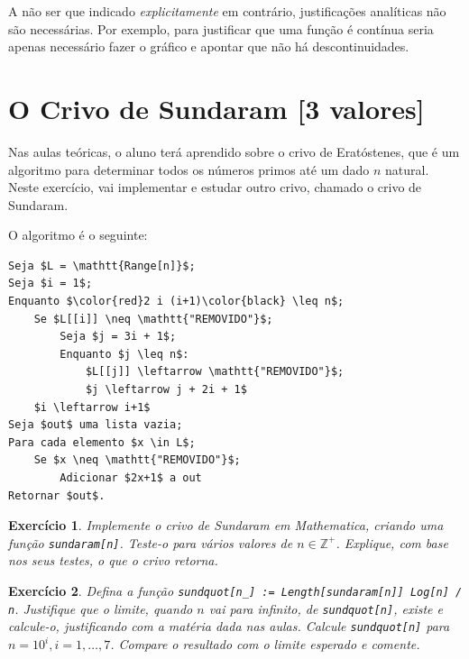 \documentclass{article}
\newtheorem{ex}{Exercício}[section]
\newcommand{\Z}{\mathbb{Z}}
\begin{document}
\smallskip

A não ser que indicado \emph{explicitamente} em contrário, justificações analíticas não são necessárias. Por exemplo, para justificar que uma função é contínua seria apenas necessário fazer o gráfico e apontar que não há descontinuidades.

\section{O Crivo de Sundaram [3 valores]}

Nas aulas teóricas, o aluno terá aprendido sobre o crivo de Eratóstenes, que é um algoritmo para determinar todos os números primos até um dado $n$ natural. Neste exercício, vai implementar e estudar outro crivo, chamado o crivo de Sundaram.

O algoritmo é o seguinte:
\begin{lstlisting}[columns=fullflexible]
Seja $L = \mathtt{Range[n]}$;
Seja $i = 1$;
Enquanto $\color{red}2 i (i+1)\color{black} \leq n$;
	Se $L[[i]] \neq \mathtt{"REMOVIDO"}$;
		Seja $j = 3i + 1$;
		Enquanto $j \leq n$:
			$L[[j]] \leftarrow \mathtt{"REMOVIDO"}$;
			$j \leftarrow j + 2i + 1$
	$i \leftarrow i+1$
Seja $out$ uma lista vazia;
Para cada elemento $x \in L$;
	Se $x \neq \mathtt{"REMOVIDO"}$;
		Adicionar $2x+1$ a out
Retornar $out$.
\end{lstlisting}

\begin{ex}
Implemente o crivo de Sundaram em Mathematica, criando uma função \texttt{sundaram[n]}. Teste-o para vários valores de $n \in \Z^+$. Explique, com base nos seus testes, o que o crivo retorna.
\end{ex}


\begin{ex}
Defina a função \texttt{sundquot[n\_] := Length[sundaram[n]] Log[n] / n}. Justifique que o limite, quando $n$ vai para infinito, de \texttt{sundquot[n]}, existe e calcule-o, justificando com a matéria dada nas aulas. Calcule \texttt{sundquot[n]} para $n = 10^i, i = 1, \dots, 7$. Compare o resultado com o limite esperado e comente.
\end{ex}
\end{document}
